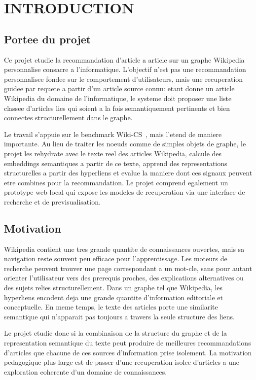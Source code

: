 \chapter{INTRODUCTION}
\thispagestyle{empty}

\section{Portee du projet}

Ce projet etudie la recommandation d'article a article sur un graphe Wikipedia
personnalise consacre a l'informatique. L'objectif n'est pas une recommandation
personnalisee fondee sur le comportement d'utilisateurs, mais une recuperation
guidee par requete a partir d'un article source connu: etant donne un article
Wikipedia du domaine de l'informatique, le systeme doit proposer une liste
classee d'articles lies qui soient a la fois semantiquement pertinents et bien
connectes structurellement dans le graphe.

Le travail s'appuie sur le benchmark Wiki-CS~\cite{mernyei2020wikics}, mais
l'etend de maniere importante. Au lieu de traiter les noeuds comme de simples
objets de graphe, le projet les rehydrate avec le texte reel des articles
Wikipedia, calcule des embeddings semantiques a partir de ce texte, apprend des
representations structurelles a partir des hyperliens et evalue la maniere dont
ces signaux peuvent etre combines pour la recommandation. Le projet comprend
egalement un prototype web local qui expose les modeles de recuperation via une
interface de recherche et de previsualisation.

\section{Motivation}

Wikipedia contient une tres grande quantite de connaissances ouvertes, mais sa
navigation reste souvent peu efficace pour l'apprentissage. Les moteurs de
recherche peuvent trouver une page correspondant a un mot-cle, sans pour autant
orienter l'utilisateur vers des prerequis proches, des explications
alternatives ou des sujets relies structurellement. Dans un graphe tel que
Wikipedia, les hyperliens encodent deja une grande quantite d'information
editoriale et conceptuelle. En meme temps, le texte des articles porte une
similarite semantique qui n'apparait pas toujours a travers la seule structure
des liens.

Le projet etudie donc si la combinaison de la structure du graphe et de la
representation semantique du texte peut produire de meilleures recommandations
d'articles que chacune de ces sources d'information prise isolement. La
motivation pedagogique plus large est de passer d'une recuperation isolee
d'articles a une exploration coherente d'un domaine de connaissances.

